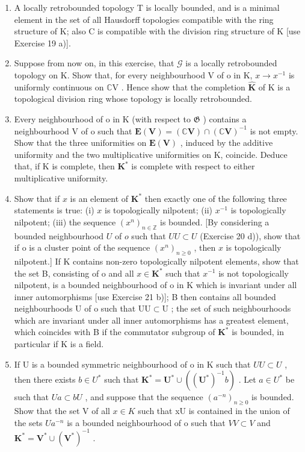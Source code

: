 \begin{enumerate}
\def\labelenumi{\alph{enumi})}
\item
  A locally retrobounded topology T is locally bounded, and is a minimal element in the set of all Hausdorff topologies compatible with the ring structure of K; also C is compatible with the division ring structure of K {[}use Exercise 19 a){]}.
\item
  Suppose from now on, in this exercise, that \(\mathcal{G}\) is a locally retrobounded topology on K. Show that, for every neighbourhood V of o in K, \(x \to x^{-1}\) is uniformly continuous on \(\mathbb{C}\mathrm{V}\) . Hence show that the completion \(\hat{\mathbf{K}}\) of K is a topological division ring whose topology is locally retrobounded.
\item
  Every neighbourhood of o in K (with respect to \(\mathfrak{G}\) ) contains a neighbourhood V of o such that \(\mathbf{E}(\mathbf{V}) = (\mathbb{C}\mathbf{V}) \cap (\mathbb{C}\mathbf{V})^{-1}\) is not empty. Show that the three uniformities on \(\mathbf{E}(\mathbf{V})\) , induced by the additive uniformity and the two multiplicative uniformities on K, coincide. Deduce that, if K is complete, then \(\mathbf{K}^*\) is complete with respect to either multiplicative uniformity.
\item
  Show that if \(x\) is an element of \(\mathbf{K}^*\) then exactly one of the following three statements is true: (i) \(x\) is topologically nilpotent; (ii) \(x^{-1}\) is topologically nilpotent; (iii) the sequence \((x^n)_{n\in \mathbb{Z}}\) is bounded. {[}By considering a bounded neighbourhood \(U\) of \(o\) such that \(UU\subset U\) (Exercise 20 d)), show that if o is a cluster point of the sequence \((x^n)_{n\geqslant 0}\) , then \(x\) is topologically nilpotent.{]} If K contains non-zero topologically nilpotent elements, show that the set B, consisting of o and all \(x\in \mathbf{K}^*\) such that \(x^{-1}\) is not topologically nilpotent, is a bounded neighbourhood of o in K which is invariant under all inner automorphisms {[}use Exercise 21 b){]}; B then contains all bounded neighbourhoods U of o such that \(\mathrm{UU}\subset \mathrm{U}\) ; the set of such neighbourhoods which are invariant under all inner automorphisms has a greatest element, which coincides with B if the commutator subgroup of \(\mathbf{K}^*\) is bounded, in particular if K is a field.
\item
  If U is a bounded symmetric neighbourhood of o in K such that \(UU \subset U\) , then there exists \(b \in U^{*}\) such that \(\mathbf{K}^{*} = \mathbf{U}^{*} \cup ((\mathbf{U}^{*})^{-1} b)\) . Let \(a \in U^{*}\) be such that \(Ua \subset bU\) , and suppose that the sequence \((a^{-n})_{n \geqslant 0}\) is bounded. Show that the set V of all \(x \in K\) such that xU is contained in the union of the sets \(Ua^{-n}\) is a bounded neighbourhood of o such that \(VV \subset V\) and \(\mathbf{K}^{*} = \mathbf{V}^{*} \cup (\mathbf{V}^{*})^{-1}\) .

\end{enumerate}
